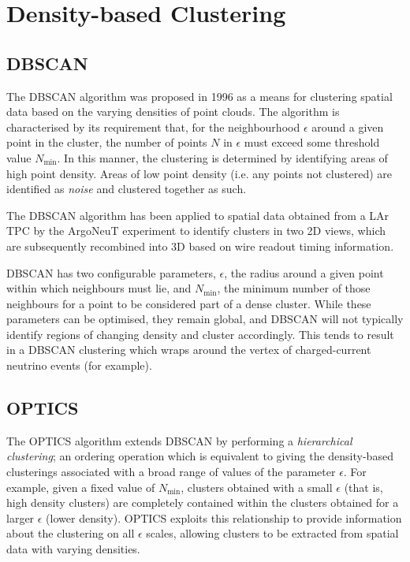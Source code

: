 \section{Density-based Clustering}
\subsection{\acs{DBSCAN}}\label{sec:latte_dbscan}
The \ac{DBSCAN} algorithm was proposed in 1996 as a means for clustering spatial data based on the varying densities of point clouds\citep{Ester1996}. The algorithm is characterised by its requirement that, for the neighbourhood $\epsilon$ around a given point in the cluster, the number of points $N$ in $\epsilon$ must exceed some threshold value $N_\mathrm{min}$. In this manner, the clustering is determined by identifying areas of high point density. Areas of low point density (i.e. any points not clustered) are identified as \emph{noise} and clustered together as such.

The \ac{DBSCAN} algorithm has been applied to spatial data obtained from a \ac{LAr TPC} by the ArgoNeuT experiment\cite{Spitz2011} to identify clusters in two 2D views, which are subsequently recombined into 3D based on wire readout timing information.

\ac{DBSCAN} has two configurable parameters, $\epsilon$, the radius around a given point within which neighbours must lie, and $N_\mathrm{min}$, the minimum number of those neighbours for a point to be considered part of a dense cluster. While these parameters can be optimised, they remain global, and \ac{DBSCAN} will not typically identify regions of changing density and cluster accordingly. This tends to result in a \ac{DBSCAN} clustering which wraps around the vertex of charged-current neutrino events (for example).

\subsection{\acs{OPTICS}}
The \ac{OPTICS} algorithm\citep{Ankerst1999} extends \ac{DBSCAN} by performing a \emph{hierarchical clustering}; an ordering operation which is equivalent to giving the density-based clusterings associated with a broad range of values of the parameter $\epsilon$. For example, given a fixed value of $N_\mathrm{min}$, clusters obtained with a small $\epsilon$ (that is, high density clusters) are completely contained within the clusters obtained for a larger $\epsilon$ (lower density). \ac{OPTICS} exploits this relationship to provide information about the clustering on all $\epsilon$ scales, allowing clusters to be extracted from spatial data with varying densities.

